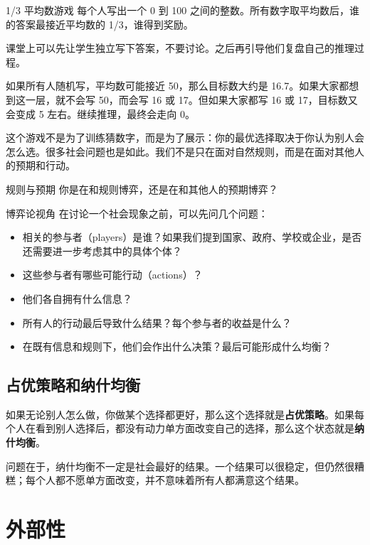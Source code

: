 \documentclass[10pt,a4paper]{ctexart}
\begin{document}
\begin{examplebox}{1/3 平均数游戏}
每个人写出一个 0 到 100 之间的整数。所有数字取平均数后，谁的答案最接近平均数的 1/3，谁得到奖励。

课堂上可以先让学生独立写下答案，不要讨论。之后再引导他们复盘自己的推理过程。
\end{examplebox}

如果所有人随机写，平均数可能接近 50，那么目标数大约是 16.7。如果大家都想到这一层，就不会写 50，而会写 16 或 17。但如果大家都写 16 或 17，目标数又会变成 5 左右。继续推理，最终会走向 0。

这个游戏不是为了训练猜数字，而是为了展示：你的最优选择取决于你认为别人会怎么选。很多社会问题也是如此。我们不是只在面对自然规则，而是在面对其他人的预期和行动。

\begin{discussionbox}{规则与预期}
你是在和规则博弈，还是在和其他人的预期博弈？
\end{discussionbox}

\begin{conceptbox}{博弈论视角}
在讨论一个社会现象之前，可以先问几个问题：
\begin{itemize}
  \item 相关的参与者（players）是谁？如果我们提到国家、政府、学校或企业，是否还需要进一步考虑其中的具体个体？
  \item 这些参与者有哪些可能行动（actions）？
  \item 他们各自拥有什么信息？
  \item 所有人的行动最后导致什么结果？每个参与者的收益是什么？
  \item 在既有信息和规则下，他们会作出什么决策？最后可能形成什么均衡？
\end{itemize}
\end{conceptbox}

\subsection{占优策略和纳什均衡}

如果无论别人怎么做，你做某个选择都更好，那么这个选择就是\textbf{占优策略}。如果每个人在看到别人选择后，都没有动力单方面改变自己的选择，那么这个状态就是\textbf{纳什均衡}。

问题在于，纳什均衡不一定是社会最好的结果。一个结果可以很稳定，但仍然很糟糕；每个人都不愿单方面改变，并不意味着所有人都满意这个结果。

\section{外部性}
\end{document}

